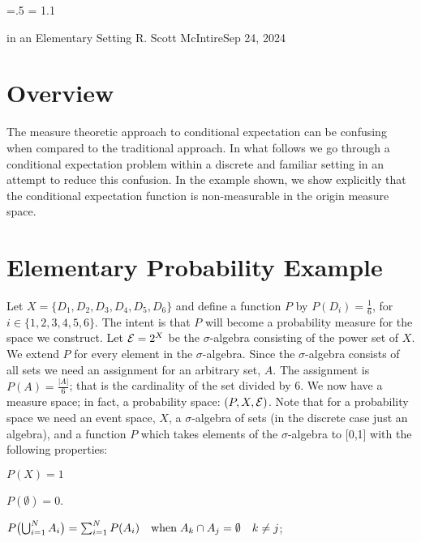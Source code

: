 




\parindent=0pt
\parskip=.5\baselineskip
\baselineskip = 1.1\baselineskip

\footline{\hss\tenrm\folio\hss}

        {in an Elementary Setting}
{R. Scott McIntire}{Sep 24, 2024}

\section{Overview}
The measure theoretic approach to conditional expectation can be confusing
when compared to the traditional approach.
In what follows we go through a conditional 
expectation problem within a discrete and familiar setting in an attempt 
to reduce this confusion. In the example shown, we show explicitly that the 
conditional expectation function is non-measurable in the origin 
measure space.


\section{Elementary Probability Example}
Let $X = \{D_1, D_2, D_3, D_4, D_5, D_6\}$ and define a function $P$ by 
$P(D_i) = \frac{1}{6}$, for $i\in \{1,2,3,4,5,6\}$. The intent is that $P$ will 
become a probability measure for the space we construct.
Let ${\cal E} = 2^X$ be the $\sigma$-algebra 
consisting of the power set of $X$. We extend $P$ for every element in the $\sigma$-algebra.
Since the $\sigma$-algebra consists of all sets 
we need an assignment for an arbitrary set, $A$. 
The assignment is $P(A) = \frac{|A|}{6}$; that is the cardinality of the set divided by 6.
We now have a measure space; in fact, a probability space: $(P,X,{\cal E})$.
Note that for a probability space we need an event space, $X$, a $\sigma$-algebra of sets 
(in the discrete case just an algebra), and a function $P$ which takes 
elements of the $\sigma$-algebra to [0,1] with the following properties:

\beginEnum
\item{$P(X) = 1$}
\item{$P(\emptyset) = 0$.}
\item{$
P\bigl(\mathop{\bigcup}_{i=1}^N A_i\bigr) = \sum_{i=1}^N P(A_i) 
\quad {\rm when}\;  A_k \cap A_j = \emptyset \quad k\neq j
$;}
\endEnum

